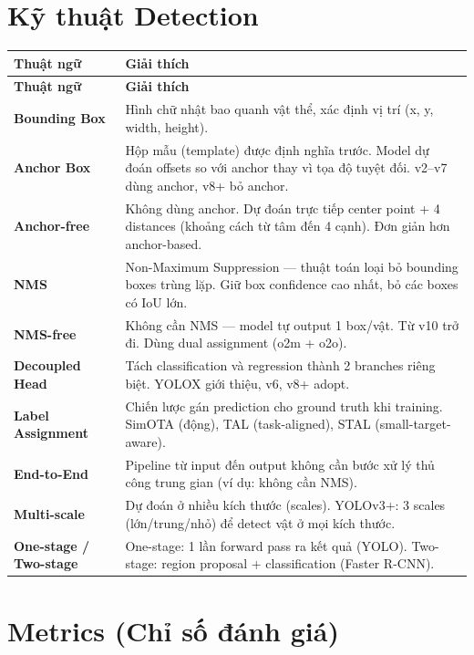 \section*{Kỹ thuật Detection}

\begin{longtable}{p{3.5cm}p{12cm}}
\toprule
\textbf{Thuật ngữ} & \textbf{Giải thích} \\
\midrule
\endfirsthead
\toprule
\textbf{Thuật ngữ} & \textbf{Giải thích} \\
\midrule
\endhead

\textbf{Bounding Box} & Hình chữ nhật bao quanh vật thể, xác định vị trí (x, y, width, height). \\
\midrule
\textbf{Anchor Box} & Hộp mẫu (template) được định nghĩa trước. Model dự đoán offsets so với anchor thay vì tọa độ tuyệt đối. v2--v7 dùng anchor, v8+ bỏ anchor. \\
\midrule
\textbf{Anchor-free} & Không dùng anchor. Dự đoán trực tiếp center point + 4 distances (khoảng cách từ tâm đến 4 cạnh). Đơn giản hơn anchor-based. \\
\midrule
\textbf{NMS} & Non-Maximum Suppression --- thuật toán loại bỏ bounding boxes trùng lặp. Giữ box confidence cao nhất, bỏ các boxes có IoU lớn. \\
\midrule
\textbf{NMS-free} & Không cần NMS --- model tự output 1 box/vật. Từ v10 trở đi. Dùng dual assignment (o2m + o2o). \\
\midrule
\textbf{Decoupled Head} & Tách classification và regression thành 2 branches riêng biệt. YOLOX giới thiệu, v6, v8+ adopt. \\
\midrule
\textbf{Label Assignment} & Chiến lược gán prediction cho ground truth khi training. SimOTA (động), TAL (task-aligned), STAL (small-target-aware). \\
\midrule
\textbf{End-to-End} & Pipeline từ input đến output không cần bước xử lý thủ công trung gian (ví dụ: không cần NMS). \\
\midrule
\textbf{Multi-scale} & Dự đoán ở nhiều kích thước (scales). YOLOv3+: 3 scales (lớn/trung/nhỏ) để detect vật ở mọi kích thước. \\
\midrule
\textbf{One-stage / Two-stage} & One-stage: 1 lần forward pass ra kết quả (YOLO). Two-stage: region proposal + classification (Faster R-CNN). \\
\bottomrule
\end{longtable}

\section*{Metrics (Chỉ số đánh giá)}


